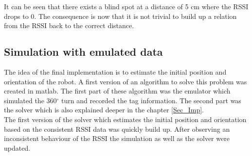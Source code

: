 It can be seen that there exists a blind spot at a distance of 5 cm where the RSSI drops to 0. The consequence is now that it is not trivial to build up a relation from the RSSI back to the correct distance. \\

\subsection{Simulation with emulated data}
The idea of the final implementation is to estimate the initial position and orientation of the robot. A first version of an algorithm to solve this problem was created in matlab. The first part of these algorithm was the emulator which simulated the 360$^\circ$ turn and recorded the tag information. The second part was the solver which is also explained deeper in the chapter \ref{Sec_Imp}. \\
The first version of the solver which estimates the initial position and orientation based on the consistent RSSI data was quickly build up. After observing an inconsistent behaviour of the RSSI the simulation as well as the solver were updated.\\

